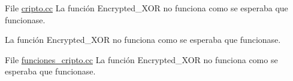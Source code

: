 
\begin{DoxyRefList}
\item[File \mbox{\hyperlink{cripto_8cc}{cripto.cc}} ]\label{bug__bug000001}%
%
La función Encrypted\+\_\+\+X\+OR no funciona como se esperaba que funcionase. 

\label{bug__bug000003}%
%
La función Encrypted\+\_\+\+X\+OR no funciona como se esperaba que funcionase.  
\item[File \mbox{\hyperlink{funciones__cripto_8cc}{funciones\+\_\+cripto.cc}} ]\label{bug__bug000002}%
%
La función Encrypted\+\_\+\+X\+OR no funciona como se esperaba que funcionase. 
\end{DoxyRefList}